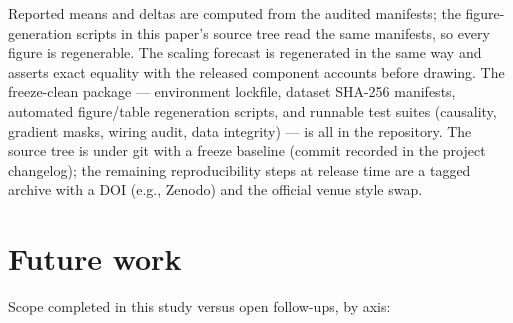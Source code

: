 Reported means and deltas are computed from the audited
manifests; the figure-generation scripts in this paper's source tree read
the same manifests, so every figure is regenerable. The scaling forecast
is regenerated in the same way and asserts exact equality with the
released component accounts before drawing. The freeze-clean
package --- environment lockfile, dataset SHA-256 manifests, automated
figure/table regeneration scripts, and runnable test suites (causality,
gradient masks, wiring audit, data integrity) --- is all in the repository.
The source tree is under git with a freeze baseline (commit recorded in
the project changelog); the remaining reproducibility steps
at release time are a tagged archive with a DOI (e.g., Zenodo) and the
official venue style swap.

\section{Future work}
\label{sec:appendix-roadmap}
Scope completed in this study versus open follow-ups, by axis:

